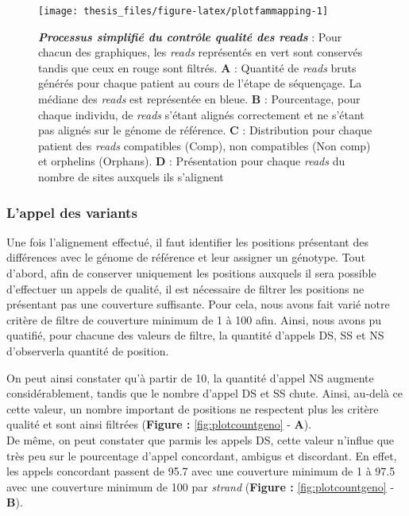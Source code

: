 \documentclass[12pt,a4paper,twoside]{ugathesis}
\begin{document}
\begin{figure}

{\centering \texttt{[image: thesis\_files/figure-latex/plotfammapping-1]} 

}

\caption[Processus simplifié du contrôle qualité des
\emph{reads}\\]{\textbf{\emph{Processus simplifié du contrôle
qualité des \emph{reads}}} : Pour chacun des graphiques, les
\emph{reads} représentés en vert sont conservés tandis que ceux en rouge
sont filtrés. \textbf{A} : Quantité de \emph{reads} bruts générés pour
chaque patient au cours de l'étape de séquençage. La médiane des
\emph{reads} est représentée en bleue. \textbf{B} : Pourcentage, pour
chaque individu, de \emph{reads} s'étant alignés correctement et ne
s'étant pas alignés sur le génome de référence. \textbf{C} :
Distribution pour chaque patient des \emph{reads} compatibles (Comp),
non compatibles (Non comp) et orphelins (Orphans). \textbf{D} :
Présentation pour chaque \emph{reads} du nombre de sites auxquels ils
s'alignent}\label{fig:plotfammapping}
\end{figure}
















\newpage

\subsubsection{L'appel des variants}\label{lappel-des-variants-1}

Une fois l'alignement effectué, il faut identifier les positions
présentant des différences avec le génome de référence et leur assigner
un génotype. Tout d'abord, afin de conserver uniquement les positions
auxquels il sera possible d'effectuer un appels de qualité, il est
nécessaire de filtrer les positions ne présentant pas une couverture
suffisante. Pour cela, nous avons fait varié notre critère de filtre de
couverture minimum de 1 à 100 afin. Ainsi, nous avons pu quatifié, pour
chacune des valeurs de filtre, la quantité d'appels DS, SS et NS
d'observerla quantité de position.

On peut ainsi constater qu'à partir de 10, la quantité d'appel NS
augmente considérablement, tandis que le nombre d'appel DS et SS chute.
Ainsi, au-delà ce cette valeur, un nombre important de positions ne
respectent plus les critère qualité et sont ainsi filtrées
(\textbf{Figure : }\ref{fig:plotcountgeno} - \textbf{A}).\\
De même, on peut constater que parmis les appels DS, cette valeur
n'influe que très peu sur le pourcentage d'appel concordant, ambigus et
discordant. En effet, les appels concordant passent de 95.7 avec une
couverture minimum de 1 à 97.5 avec une couverture minimum de 100 par
\emph{strand} (\textbf{Figure : }\ref{fig:plotcountgeno} - \textbf{B}).
\end{document}
